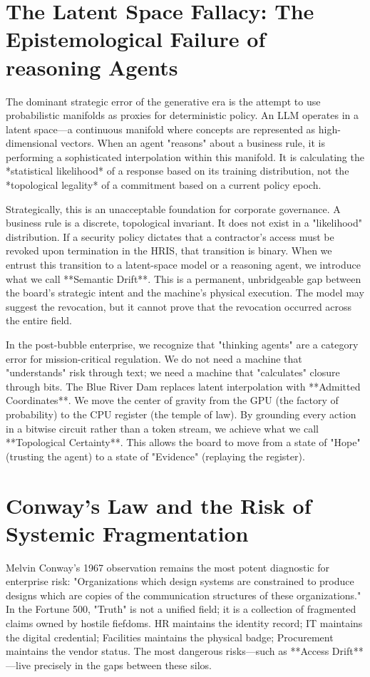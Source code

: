 \documentclass[12pt,a4paper,oneside]{book}
\begin{document}
\section{The Latent Space Fallacy: The Epistemological Failure of reasoning Agents}
The dominant strategic error of the generative era is the attempt to use probabilistic manifolds as proxies for deterministic policy. An LLM operates in a latent space---a continuous manifold where concepts are represented as high-dimensional vectors. When an agent "reasons" about a business rule, it is performing a sophisticated interpolation within this manifold. It is calculating the *statistical likelihood* of a response based on its training distribution, not the *topological legality* of a commitment based on a current policy epoch.

Strategically, this is an unacceptable foundation for corporate governance. A business rule is a discrete, topological invariant. It does not exist in a "likelihood" distribution. If a security policy dictates that a contractor's access must be revoked upon termination in the HRIS, that transition is binary. When we entrust this transition to a latent-space model or a reasoning agent, we introduce what we call **Semantic Drift**. This is a permanent, unbridgeable gap between the board's strategic intent and the machine's physical execution. The model may suggest the revocation, but it cannot prove that the revocation occurred across the entire field.

In the post-bubble enterprise, we recognize that "thinking agents" are a category error for mission-critical regulation. We do not need a machine that "understands" risk through text; we need a machine that "calculates" closure through bits. The Blue River Dam replaces latent interpolation with **Admitted Coordinates**. We move the center of gravity from the GPU (the factory of probability) to the CPU register (the temple of law). By grounding every action in a bitwise circuit rather than a token stream, we achieve what we call **Topological Certainty**. This allows the board to move from a state of "Hope" (trusting the agent) to a state of "Evidence" (replaying the register).

\section{Conway's Law and the Risk of Systemic Fragmentation}
Melvin Conway's 1967 observation remains the most potent diagnostic for enterprise risk: "Organizations which design systems are constrained to produce designs which are copies of the communication structures of these organizations." In the Fortune 500, "Truth" is not a unified field; it is a collection of fragmented claims owned by hostile fiefdoms. HR maintains the identity record; IT maintains the digital credential; Facilities maintains the physical badge; Procurement maintains the vendor status. The most dangerous risks---such as **Access Drift**---live precisely in the gaps between these silos.
\end{document}

